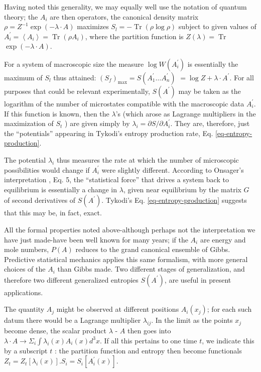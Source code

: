 \documentclass{article}
\begin{document}
Having noted this generality, we may equally well use the notation of quantum theory; the $A_i$ are then operators, the canonical density matrix $\rho=Z^{-1} \exp (-\lambda \cdot A)$ maximizes $S_l=-\operatorname{Tr}(\rho \log \rho)$ subject to given values of $A_i^{\prime}=\left\langle A_i\right\rangle=\operatorname{Tr}\left(\rho A_i\right)$, where the partition function is $Z(\lambda)=\operatorname{Tr}$ $\exp (-\lambda \cdot A)$.

For a system of macroscopic size the measure $\log W\left(A_i^{\prime}\right)$ is \cite{jaynes1965;jaynes1978} essentially the maximum of $S_l$ thus attained: $\left(S_f\right)_{\max }=S\left(A_1^{\prime} \ldots A_n^{\prime}\right)$ $=\log Z+\lambda \cdot A^{\prime}$. For all purposes that could be relevant experimentally, $S\left(A^{\prime}\right)$ may be taken as the logarithm of the number of microstates compatible with the macroscopic data $A_i^{\prime}$. If this function is known, then the $\lambda$'s (which arose as Lagrange multipliers in the maximization of $S_t$ ) are given simply by $\lambda_i=\partial S / \partial A_i^{\prime}$. They are, therefore, just the ``potentials'' appearing in Tykodi's entropy production rate, Eq. \ref{eq-entropy-production}.

The potential $\lambda_i$ thus measures the rate at which the number of microscopic possibilities would change if $A_i^{\prime}$ were slightly different. According to Onsager's interpretation \cite{onsager1931a;onsager1931b}, Eq. 5, the ``statistical force'' that drives a system back to equilibrium is essentially a change in $\lambda$, given near equilibrium by the matrix $G$ of second derivatives of $S\left(A^{\prime}\right)$. Tykodi's Eq. \ref{eq-entropy-production} suggests that this may be, in fact, exact.

All the formal properties noted above-although perhaps not the interpretation we have just made-have been well known for many years; if the $A_i$ are energy and mole numbers, $P(A)$ reduces to the grand canonical ensemble of Gibbs. Predictive statistical mechanics applies this same formalism, with more general choices of the $A_i$ than Gibbs made. Two different stages of generalization, and therefore two different generalized entropies $S\left(A^{\prime}\right)$, are useful in present applications.

The quantity $A_j$ might be observed at different positions $A_i\left(x_j\right)$; for each such datum there would be a Lagrange multiplier $\lambda_{i j}$. In the limit as the points $x_j$ become dense, the scalar product $\lambda$ - $A$ then goes into $\lambda \cdot A \rightarrow \Sigma_i \int \lambda_i(x) A_i(x) d^3 x$. If all this pertains to one time $t$, we indicate this by a subscript $t$ : the partition function and entropy then become functionals $Z_t=Z_t\left[\lambda_i(x)\right] . S_i=S_i\left[A_i^{\prime}(x)\right]$.
\end{document}
